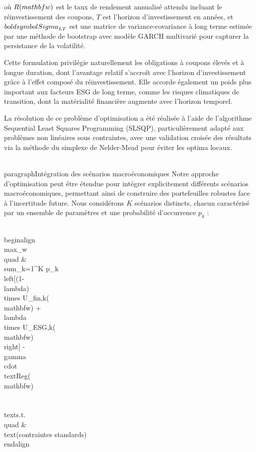 où $R(\\mathbf{w})$ est le taux de rendement annualisé attendu incluant le réinvestissement des coupons, $T$ est l'horizon d'investissement en années, et $\\boldsymbol{\\Sigma}_{LT}$ est une matrice de variance-covariance à long terme estimée par une méthode de bootstrap avec modèle GARCH multivarié pour capturer la persistance de la volatilité.

Cette formulation privilégie naturellement les obligations à coupons élevés et à longue duration, dont l'avantage relatif s'accroît avec l'horizon d'investissement grâce à l'effet composé du réinvestissement. Elle accorde également un poids plus important aux facteurs ESG de long terme, comme les risques climatiques de transition, dont la matérialité financière augmente avec l'horizon temporel.

La résolution de ce problème d'optimisation a été réalisée à l'aide de l'algorithme Sequential Least Squares Programming (SLSQP), particulièrement adapté aux problèmes non linéaires sous contraintes, avec une validation croisée des résultats via la méthode du simplexe de Nelder-Mead pour éviter les optima locaux.

\\paragraph{Intégration des scénarios macroéconomiques}
Notre approche d'optimisation peut être étendue pour intégrer explicitement différents scénarios macroéconomiques, permettant ainsi de construire des portefeuilles robustes face à l'incertitude future. Nous considérons $K$ scénarios distincts, chacun caractérisé par un ensemble de paramètres et une probabilité d'occurrence $p_k$ :

\\begin{align}
\\max_w \\quad & \\sum_{k=1}^{K} p_k \\left[(1-\\lambda) \\times U_{fin,k}(\\mathbf{w}) + \\lambda \\times U_{ESG,k}(\\mathbf{w})\\right] - \\gamma \\cdot \\text{Reg}(\\mathbf{w}) \\\\
\\text{s.t.} \\quad & \\text{(contraintes standards)}
\\end{align}


